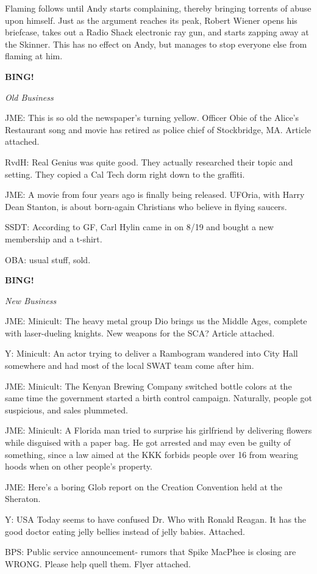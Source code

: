 \documentclass[12pt]{article}
\newcommand{\bing}{{\bf BING!} }
\newcommand{\goto}[1]{\bing \vskip 12pt \centerline{{\em{#1}}}}
\begin{document}
Flaming follows until Andy starts complaining, thereby bringing torrents of abuse upon himself. Just as the argument reaches its peak, Robert Wiener opens his briefcase, takes out a Radio Shack electronic ray gun, and starts zapping away at the Skinner. This has no effect on Andy, but manages to stop everyone else from flaming at him.

\goto{Old Business}

JME: This is so old the newspaper's turning yellow. Officer Obie of the Alice's Restaurant song and movie has retired as police chief of Stockbridge, MA. Article attached.

RvdH: Real Genius was quite good. They actually researched their topic and setting. They copied a Cal Tech dorm right down to the graffiti.

JME: A movie from four years ago is finally being released. UFOria, with Harry Dean Stanton, is about born-again Christians who believe in flying saucers.

SSDT: According to GF, Carl Hylin came in on 8/19 and bought a new membership and a t-shirt.

OBA: usual stuff, sold.

\goto{New Business}

JME: Minicult: The heavy metal group Dio brings us the Middle Ages, complete with laser-dueling knights. New weapons for the SCA? Article attached.

Y: Minicult: An actor trying to deliver a Rambogram wandered into City Hall somewhere and had most of the local SWAT team come after him.

JME: Minicult: The Kenyan Brewing Company switched bottle colors at the same time the government started a birth control campaign. Naturally, people got suspicious, and sales plummeted.

JME: Minicult: A Florida man tried to surprise his girlfriend by delivering flowers while disguised with a paper bag. He got arrested and may even be guilty of something, since a law aimed at the KKK forbids people over 16 from wearing hoods when on other people's property.

JME: Here's a boring Glob report on the Creation Convention held at the Sheraton.

Y: USA Today seems to have confused Dr. Who with Ronald Reagan. It has the good doctor eating jelly bellies instead of jelly babies. Attached.

BPS: Public service announcement- rumors that Spike MacPhee is closing are WRONG. Please help quell them. Flyer attached.
\end{document}
